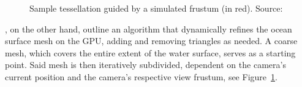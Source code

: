 \begin{figure}
{}
\caption{\textcolor{changed}{
Sample tessellation guided by a simulated frustum (in red). Source:~\citet{Centelles:2014}
}}
\label{fig:centelles:mesh}
\end{figure}
%
\textcolor{changed}{\cite{Centelles:2014}, on the other hand, outline an algorithm that dynamically refines the ocean surface mesh
on the GPU, adding and removing triangles as needed.
A coarse mesh, which covers the entire extent of the water surface, serves
as a starting point. Said mesh is then iteratively subdivided, dependent
on the camera's current position and the camera's respective view frustum,
see Figure~\ref{fig:centelles:mesh}.
}
%
%
%
